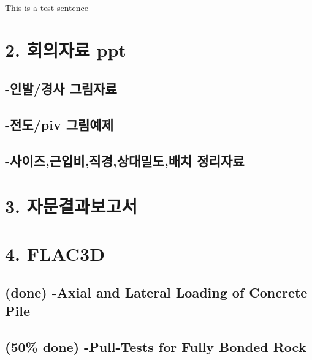 \documentclass[a4paper, nobind]{templates/ociamthesis}
\begin{document}
This is a test sentence

\hypertarget{uxd68cuxc758uxc790uxb8cc-ppt}{%
\section{2. 회의자료 ppt}\label{uxd68cuxc758uxc790uxb8cc-ppt}}

\hypertarget{uxc778uxbc1cuxacbduxc0ac-uxadf8uxb9bcuxc790uxb8cc}{%
\subsection{-인발/경사 그림자료}\label{uxc778uxbc1cuxacbduxc0ac-uxadf8uxb9bcuxc790uxb8cc}}

\hypertarget{uxc804uxb3c4piv-uxadf8uxb9bcuxc608uxc81c}{%
\subsection{-전도/piv 그림예제}\label{uxc804uxb3c4piv-uxadf8uxb9bcuxc608uxc81c}}

\hypertarget{uxc0acuxc774uxc988uxadfcuxc785uxbe44uxc9c1uxacbduxc0c1uxb300uxbc00uxb3c4uxbc30uxce58-uxc815uxb9acuxc790uxb8cc}{%
\subsection{-사이즈,근입비,직경,상대밀도,배치 정리자료}\label{uxc0acuxc774uxc988uxadfcuxc785uxbe44uxc9c1uxacbduxc0c1uxb300uxbc00uxb3c4uxbc30uxce58-uxc815uxb9acuxc790uxb8cc}}

\hypertarget{uxc790uxbb38uxacb0uxacfcuxbcf4uxace0uxc11c}{%
\section{3. 자문결과보고서}\label{uxc790uxbb38uxacb0uxacfcuxbcf4uxace0uxc11c}}

\hypertarget{flac3d}{%
\section{4. FLAC3D}\label{flac3d}}

\hypertarget{done--axial-and-lateral-loading-of-concrete-pile}{%
\subsection{(done) -Axial and Lateral Loading of Concrete Pile}\label{done--axial-and-lateral-loading-of-concrete-pile}}

\hypertarget{done--pull-tests-for-fully-bonded-rock}{%
\subsection{(50\% done) -Pull-Tests for Fully Bonded Rock}\label{done--pull-tests-for-fully-bonded-rock}}
\end{document}
